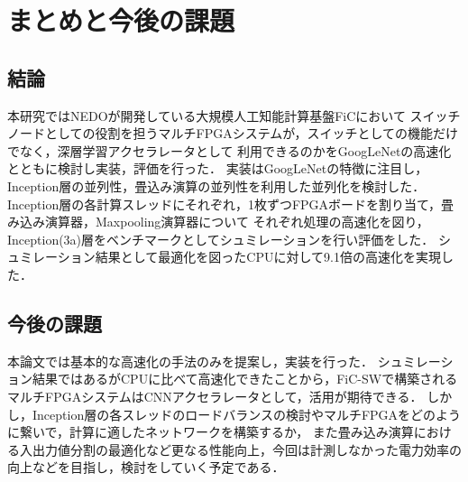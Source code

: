 \chapter{まとめと今後の課題}
{
\label{chap:conclusion}
\section{結論}
\label{sec:conclusion}
本研究ではNEDOが開発している大規模人工知能計算基盤FiCにおいて
スイッチノードとしての役割を担うマルチFPGAシステムが，スイッチとしての機能だけでなく，深層学習アクセラレータとして
利用できるのかをGoogLeNetの高速化とともに検討し実装，評価を行った．
実装はGoogLeNetの特徴に注目し，Inception層の並列性，畳込み演算の並列性を利用した並列化を検討した．
Inception層の各計算スレッドにそれぞれ，1枚ずつFPGAボードを割り当て，畳み込み演算器，Maxpooling演算器について
それぞれ処理の高速化を図り，Inception(3a)層をベンチマークとしてシュミレーションを行い評価をした．
シュミレーション結果として最適化を図ったCPUに対して9.1倍の高速化を実現した．

\section{今後の課題}
\label{sec:future}
本論文では基本的な高速化の手法のみを提案し，実装を行った．
シュミレーション結果ではあるがCPUに比べて高速化できたことから，FiC-SWで構築される
マルチFPGAシステムはCNNアクセラレータとして，活用が期待できる．
しかし，Inception層の各スレッドのロードバランスの検討やマルチFPGAをどのように繋いで，計算に適したネットワークを構築するか，
また畳み込み演算における入出力値分割の最適化など更なる性能向上，今回は計測しなかった電力効率の向上などを目指し，検討をしていく予定である．
}
